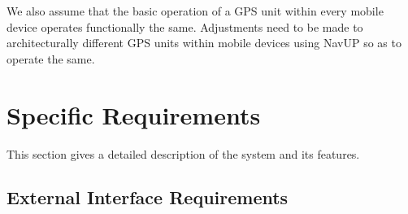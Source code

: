 \documentclass{article}
\begin{document}
        \begin{flushleft}
        We also assume that the basic operation of a GPS unit within every mobile device operates functionally the same. Adjustments need to be made to architecturally different GPS units within mobile devices using NavUP so as to operate the same.
        \end{flushleft}
\section{Specific Requirements}
    \begin{flushleft}
    This section gives a detailed description of the system and its features.
    \end{flushleft}
    \subsection{External Interface Requirements}
\end{document}
